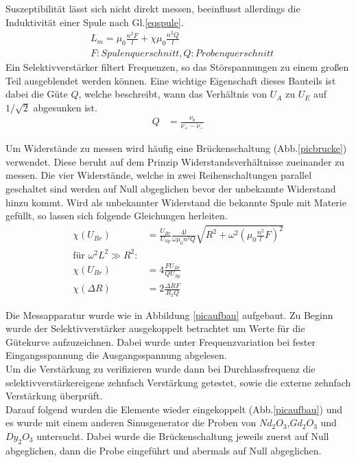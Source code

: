 Suszeptibilität lässt sich nicht direkt messen, beeinflusst allerdings die Induktivität einer
Spule nach Gl.\ref{eqspule}.
\begin{align}
&L_m=\mu_0 \frac{n^2 F}{l} + \chi \mu_0 \frac{n^2 Q}{l} \label{eqspule} \\
&F: Spulenquerschnitt, Q: Probenquerschnitt \nonumber
\end{align}
Ein Selektivverstärker filtert Frequenzen, so das Störspannungen zu einem großen Teil ausgeblendet 
werden können. Eine wichtige Eigenschaft dieses Bauteils ist dabei die Güte $Q$, welche beschreibt, 
wann das Verhältnis von $U_A$ zu $U_E$ auf $1/\sqrt{2}$ abgesunken ist.
\begin{align}
Q&=\frac{\nu_0}{\nu_+ - \nu_-} \label{eqn:engute}
\end{align}

\FloatBarrier
Um Widerstände zu messen wird häufig eine Brückenschaltung (Abb.\ref{picbrucke}) verwendet. Diese beruht auf dem Prinzip 
Widerstandsverhältnisse zueinander zu messen. Die vier Widerstände, welche in zwei Reihenschaltungen
parallel geschaltet sind werden auf Null abgeglichen bevor der unbekannte Widerstand hinzu kommt. 
Wird als unbekannter Widerstand die bekannte Spule mit Materie gefüllt, so lassen sich folgende Gleichungen
herleiten.
\begin{align}
\chi(U_{Br})&=\frac{U_{Br}}{U_{Sp}}\frac{4l}{\omega \mu_0 n^2 Q} \sqrt{R^2 + \omega^2 (\mu_0 \frac{n^2}{l} F)^2} \\
\text{für } \omega^2 L^2 \gg R^2 : \nonumber \\
\chi(U_{Br})&=4 \frac{F U_{Br}}{Q U_{Sp}} \label{eqchiu}\\ %
\chi(\Delta R)&=2 \frac{\Delta R F}{R_3 Q} \label{eqchir}
\end{align}

Die Messapparatur wurde wie in Abbildung \ref{picaufbau} aufgebaut. Zu Beginn wurde der Selektivverstärker
ausgekoppelt betrachtet um Werte für die Gütekurve aufzuzeichnen. Dabei wurde unter Frequenzvariation bei 
fester Eingangsspannung die Ausgangsspannung abgelesen. \\ 
Um die Verstärkung zu verifizieren wurde dann bei Durchlassfrequenz die selektivverstärkereigene zehnfach 
Verstärkung getestet, sowie die externe zehnfach Verstärkung überprüft.\\
Darauf folgend wurden die Elemente wieder eingekoppelt (Abb.\ref{picaufbau}) und es wurde mit einem anderen 
Sinusgenerator die Proben von $Nd_2O_3$,$Gd_2O_3$ und $Dy_2O_3$ untersucht. Dabei wurde die Brückenschaltung
jeweils zuerst auf Null abgeglichen, dann die Probe eingeführt und abermals auf Null abgeglichen.

